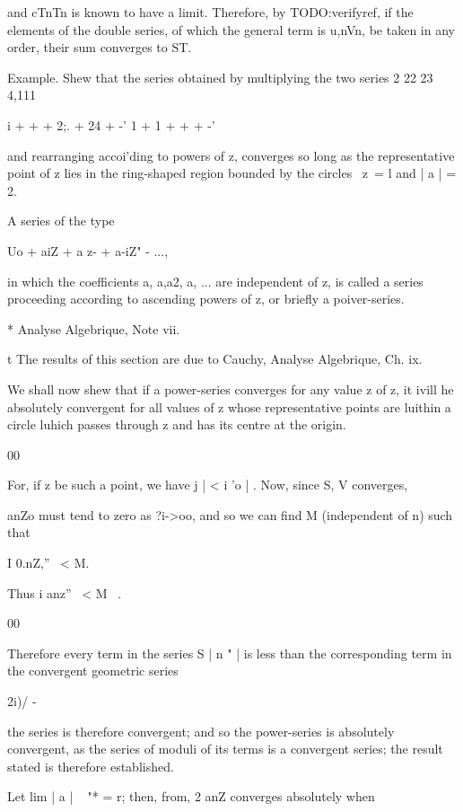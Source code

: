 and cTnTn is known to have a limit. Therefore, by TODO:verifyref, if the
elements of the double series, of which the general term is u,nVn, be
taken in any order, their sum converges to ST.

Example. Shew that the series obtained by multiplying the two series 2
22 23 4,111

i + + + 2;. + 24 + -' 1 + 1 + + + -'

and rearranging accoi'ding to powers of z, converges so long as the
representative point of z lies in the ring-shaped region bounded by
the circles \ z\ = l and | a | = 2.


A series of the type

Uo + aiZ + a z- + a-iZ" - ...,

in which the coefficients a, a,a2, a, ... are independent of z, is
called a series proceeding according to ascending powers of z, or
briefly a poiver-series.

* Analyse Algebrique, Note vii.

t The results of this section are due to Cauchy, Analyse Algebrique,
Ch. ix.

%
%

We shall now shew that if a power-series converges for any value z of
z, it ivill he absolutely convergent for all values of z whose
representative points are luithin a circle luhich passes through z and
has its centre at the origin.

00

For, if z be such a point, we have j | < i 'o | . Now, since S, V
converges,

anZo must tend to zero as ?i->oo, and so we can find M (independent
of n) such that

I 0.nZ,'' \ < M.

Thus i anz'' \ < M \ .

00

Therefore every term in the series S | n " | is less than the
corresponding term in the convergent geometric series

2i)/ -

the series is therefore convergent; and so the power-series is
absolutely convergent, as the series of moduli of its terms is a
convergent series; the result stated is therefore established.

Let lim | a | ~ "* = r; then, from, 2 anZ converges absolutely
when


